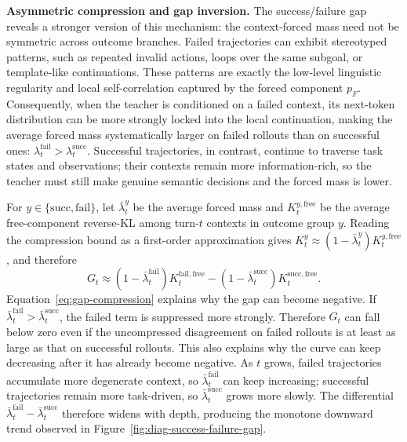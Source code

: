 \textbf{Asymmetric compression and gap inversion.}
The success/failure gap reveals a stronger version of this mechanism: the
context-forced mass need not be symmetric across outcome branches. Failed
trajectories can exhibit stereotyped patterns, such as repeated invalid
actions, loops over the same subgoal, or template-like continuations. These
patterns are exactly the low-level linguistic regularity and local
self-correlation captured by the forced component $p_F$. Consequently, when the
teacher is conditioned on a failed context, its next-token distribution can be
more strongly locked into the local continuation, making the average forced mass
systematically larger on failed rollouts than on successful ones:
$\lambda_t^{\mathrm{fail}}>\lambda_t^{\mathrm{succ}}$. Successful trajectories,
in contrast, continue to traverse task states and observations; their contexts
remain more information-rich, so the teacher must still make genuine semantic
decisions and the forced mass is lower.

For $y\in\{\mathrm{succ},\mathrm{fail}\}$, let $\bar{\lambda}_t^{y}$ be the
average forced mass and $K_t^{y,\mathrm{free}}$ be the average free-component
reverse-KL among turn-$t$ contexts in outcome group $y$. Reading the compression
bound as a first-order approximation gives
$K_t^{y}\approx(1-\bar{\lambda}_t^{y})K_t^{y,\mathrm{free}}$, and therefore
\begin{equation}
G_t
  \approx
  (1-\bar{\lambda}_t^{\mathrm{fail}})K_t^{\mathrm{fail},\mathrm{free}}
  -
  (1-\bar{\lambda}_t^{\mathrm{succ}})K_t^{\mathrm{succ},\mathrm{free}} .
\label{eq:gap-compression}
\end{equation}
Equation~\ref{eq:gap-compression} explains why the gap can become negative. If
$\bar{\lambda}_t^{\mathrm{fail}}>\bar{\lambda}_t^{\mathrm{succ}}$, the failed
term is suppressed more strongly. Therefore $G_t$ can fall below zero even if
the uncompressed disagreement on failed rollouts is at least as large as that on
successful rollouts. This also explains why the curve can keep decreasing after
it has already become negative. As $t$ grows, failed trajectories accumulate
more degenerate context, so $\bar{\lambda}_t^{\mathrm{fail}}$ can keep
increasing; successful trajectories remain more task-driven, so
$\bar{\lambda}_t^{\mathrm{succ}}$ grows more slowly. The differential
$\bar{\lambda}_t^{\mathrm{fail}}-\bar{\lambda}_t^{\mathrm{succ}}$ therefore
widens with depth, producing the monotone downward trend observed in
Figure~\ref{fig:diag-success-failure-gap}.

